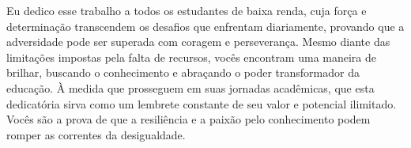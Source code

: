 \newpage
    \begin{dedicatoria}
       \vspace*{\fill}
       \centering
       \hspace{.9\textwidth}
            \begin{minipage}{.6\textwidth}
            \setlength{\parskip}{0.5cm}	
            \fonteDedicatoria 
            \begin{itshape}
            	Eu dedico esse trabalho a todos os estudantes de baixa renda, cuja força e determinação transcendem os desafios que enfrentam diariamente, provando que a adversidade pode ser superada com coragem e perseverança. Mesmo diante das limitações impostas pela falta de recursos, vocês encontram uma maneira de brilhar, buscando o conhecimento e abraçando o poder transformador da educação. À medida que prosseguem em suas jornadas acadêmicas, que esta dedicatória sirva como um lembrete constante de seu valor e potencial ilimitado. Vocês são a prova de que a resiliência e a paixão pelo conhecimento podem romper as correntes da desigualdade.        
            \end{itshape}
            \end{minipage}
        \vspace*{\fill}
    \end{dedicatoria}